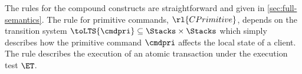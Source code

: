 The rules for the compound constructs are straightforward and given in \cref{sec:full-semantics}.
The rule for primitive commands, $\rl{CPrimitive}$, 
depends on the 
transition system $\toLTS{\cmdpri} \subseteq \Stacks \times \Stacks$ 
which simply describes how the primitive command $\cmdpri$ affects the local state of a client.
The rule   describes the execution of an atomic 
transaction under the execution test $\ET$. 


